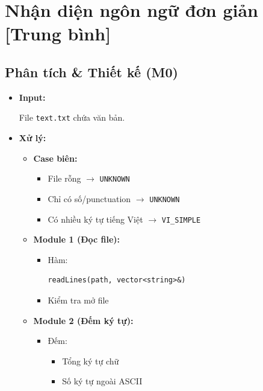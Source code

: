 \section{Nhận diện ngôn ngữ đơn giản [Trung bình]}
\subsection{Phân tích \& Thiết kế (M0)}

\begin{itemize}

    \item \textbf{Input:}

    File \texttt{text.txt} chứa văn bản.

    \item \textbf{Xử lý:}

    \begin{itemize}

        \item \textbf{Case biên:}

        \begin{itemize}
            \item File rỗng
            $\rightarrow$
            \texttt{UNKNOWN}
            \item Chỉ có số/punctuation
            $\rightarrow$
            \texttt{UNKNOWN}
            \item Có nhiều ký tự tiếng Việt
            $\rightarrow$
            \texttt{VI\_SIMPLE}
        \end{itemize}

        \item \textbf{Module 1 (Đọc file):}

        \begin{itemize}
            \item Hàm:
\begin{lstlisting}
readLines(path, vector<string>&)
\end{lstlisting}

            \item Kiểm tra mở file
        \end{itemize}

        \item \textbf{Module 2 (Đếm ký tự):}

        \begin{itemize}
            \item Đếm:
            \begin{itemize}
                \item Tổng ký tự chữ
                \item Số ký tự ngoài ASCII
            \end{itemize}


\end{itemize}
\end{itemize}
\end{itemize}
